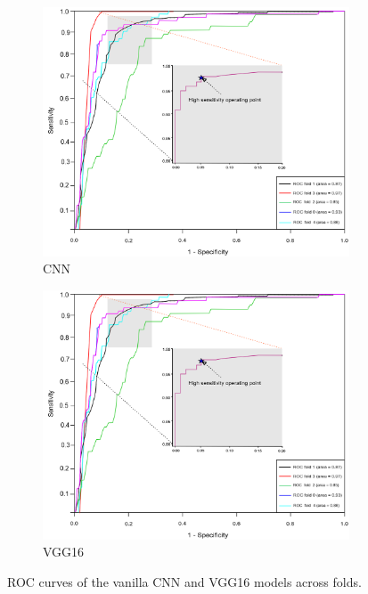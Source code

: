 \begin{figure}
	\centering
	\begin{subfigure}{.48\linewidth}
		\centering
		\includegraphics[scale=0.7]{images/roc_1000_genome.PNG}
		\caption{CNN}
        \label{fig:roc_cnn}
	\end{subfigure}
	\hspace{2mm}
	\begin{subfigure}{0.48\linewidth}
		\centering
		\includegraphics[scale=0.7]{images/roc_1000_genome.PNG}
		\caption{VGG16}
        \label{fig:roc_vgg16}
	\end{subfigure}
	\caption{ROC curves of the vanilla CNN and VGG16 models across folds.} 
	\label{fig:rocs}
	\vspace{-4mm}
\end{figure}
\fi 

